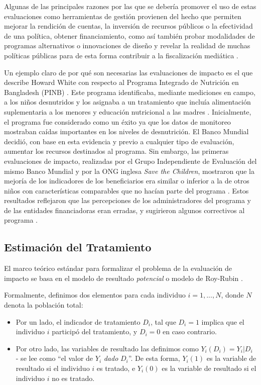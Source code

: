 \documentclass[../../main.tex]{subfiles}
\begin{document}
Algunas de las principales razones por las que se debería promover el uso de estas evaluaciones como herramientas de gestión provienen del hecho que permiten mejorar la rendición de cuentas, la inversión de recursos públicos o la efectividad de una política, obtener financiamiento, como así también probar modalidades de programas alternativos o innovaciones de diseño \cite{gertler-2016} y revelar la realidad de muchas políticas públicas para de esta forma contribuir a la fiscalización mediática \cite{bernal}.

Un ejemplo claro de por qué son necesarias las evaluaciones de impacto es el que describe Howard White con respecto al Programa Integrado de Nutrición en Bangladesh (PINB) \cite{white2009theory}. Este programa identificaba, mediante mediciones en campo, a los niños desnutridos y los asignaba a un tratamiento que incluía alimentación suplementaria a los menores y educación nutricional a las madres \cite{bernal}. Inicialmente, el programa fue considerado como un éxito ya que los datos de monitoreo mostraban caídas importantes en los niveles de desnutrición. El Banco Mundial decidió, con base en esta evidencia y previo a cualquier tipo de evaluación, aumentar los recursos destinados al programa. Sin embargo, las primeras evaluaciones de impacto, realizadas por el Grupo Independiente de Evaluación del mismo Banco Mundial y por la ONG inglesa \textit{Save the Children}, mostraron que la mejoría de los indicadores de los beneficiarios era similar o inferior a la de otros niños con características comparables que no hacían parte del programa \cite{bernal}. Estos resultados reflejaron que las percepciones de los administradores del programa y de las entidades financiadoras eran erradas, y sugirieron algunos correctivos al programa \cite{bernal}.

\subsection{Estimación del Tratamiento}
El marco teórico estándar para formalizar el problema de la evaluación de impacto se basa en el modelo de resultado \textit{potencial} o modelo de Roy-Rubin \cite{rubin1974}. 

Formalmente, definimos dos elementos para cada individuo \(i = 1,...,N\), donde \(N\) denota la población total:
\begin{itemize}
    \item Por un lado, el indicador de tratamiento \(D_i\), tal que \(D_i = 1\) implica que el individuo \(i\) participó del tratamiento, y \(D_i = 0\) en caso contrario.
    \item Por otro lado, las variables de resultado las definimos como \(Y_i(D_i) = Y_i|D_i\) - se lee como ``el valor de \(Y_i\) \textit{dado} \(D_i\)''. De esta forma, \(Y_i(1)\) es la variable de resultado si el individuo \(i\) es tratado, e \(Y_i(0)\) es la variable de resultado si el individuo \(i\) no es tratado.
\end{itemize}
\end{document}
